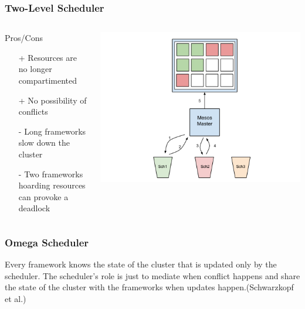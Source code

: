 \documentclass[notes=hide]{beamer}
\begin{document}
  \note{}

  \begin{frame}
    \frametitle{Two-Level Scheduler}
       \begin{columns}[T]
       \begin{column}{.5\textwidth}
        \begin{block}{Pros/Cons}
            \begin{itemize}
              \item[+] Resources are no longer compartimented
              \item[+] No possibility of conflicts
              \item[-] Long frameworks slow down the cluster
              \item[-] Two frameworks hoarding resources can provoke a deadlock
            \end{itemize}
        \end{block}
        \end{column}
        \begin{column}{.6\textwidth}
         \includegraphics[trim = 50mm 0mm 0mm 0mm,clip,scale=0.30,natwidth=960,natheight=720]{TwoLevel-slides.png}
        \end{column}
      \end{columns}
  \end{frame}

  \note{}

  \begin{frame}
    \frametitle{Omega Scheduler}
    \begin{definition}
      Every framework knows the state of the cluster that
      is updated only by the scheduler. The scheduler's role
      is just to mediate when conflict happens and share
      the state of the cluster with the frameworks when updates
      happen.(Schwarzkopf et al.)
    \end{definition}
  \end{frame}
\end{document}
